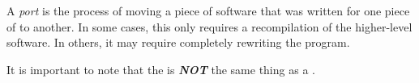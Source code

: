 \begin{definition}[Port]\label{def:Software_Port}
  A \emph{port} is the process of moving a piece of software that was written for one piece of  to another.
  In some cases, this only requires a recompilation of the higher-level software.
  In others, it may require completely rewriting the program.

  \begin{remark}\label{rmk:Software_Port_Confusion}
    It is important to note that the  is \textbf{\emph{NOT}} the same thing as a .
  \end{remark}
\end{definition}

